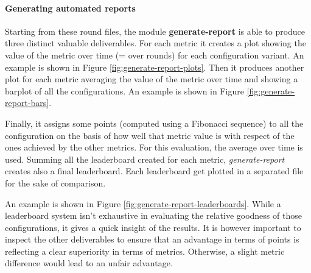 \begin{table}[H]
  \label{tbl:round-file-example}
\end{table}

\paragraph{Generating automated reports}

Starting from these round files, the module \textbf{generate-report} is able to produce three distinct valuable deliverables.
For each metric it creates a plot showing the value of the metric over time (= over rounds) for each configuration variant.
An example is shown in Figure \ref{fig:generate-report-plots}.
Then it produces another plot for each metric averaging the value of the metric over time and showing a barplot of all the configurations.
An example is shown in Figure \ref{fig:generate-report-bars}.

Finally, it assigns some points (computed using a Fibonacci sequence) to all the configuration on the basis of how well that metric value is with respect of the ones achieved by the other metrics.
For this evaluation, the average over time is used.
Summing all the leaderboard created for each metric, \textit{generate-report} creates also a final leaderboard.
Each leaderboard get plotted in a separated file for the sake of comparison.

An example is shown in Figure \ref{fig:generate-report-leaderboards}.
While a leaderboard system isn't exhaustive in evaluating the relative goodness of those configurations, it gives a quick insight of the results.
It is however important to inspect the other deliverables to ensure that an advantage in terms of points is reflecting a clear superiority in terms of metrics.
Otherwise, a slight metric difference would lead to an unfair advantage.

